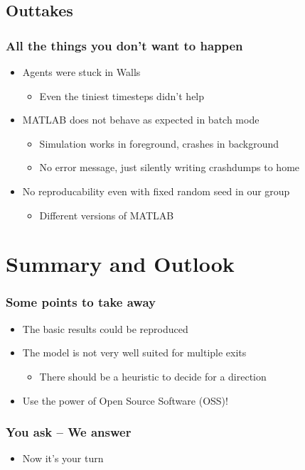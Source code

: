 \documentclass{beamer}
\begin{document}
\subsection{Outtakes}

\begin{frame}
	\frametitle{All the things you don't want to happen}
	\begin{itemize}
		\item Agents were stuck in Walls
		\begin{itemize}
			\item Even the tiniest timesteps didn't help
		\end{itemize}
		\item MATLAB does not behave as expected in batch mode
		\begin{itemize}
			\item Simulation works in foreground, crashes in background
			\item No error message, just silently writing crashdumps to home
		\end{itemize}
		\item No reproducability even with fixed random seed in our group
		\begin{itemize}
			\item Different versions of MATLAB
		\end{itemize}
	\end{itemize}
\end{frame}


\section{Summary and Outlook}
\begin{frame}
	\frametitle{Some points to take away}
	\begin{itemize}
		\item The basic results could be reproduced
		\item The model is not very well suited for multiple exits
		\begin{itemize}
			\item There should be a heuristic to decide for a direction
		\end{itemize}
		\item Use the power of Open Source Software (OSS)!
	\end{itemize}
\end{frame}

\begin{frame}
	\frametitle{You ask -- We answer}
	\begin{itemize}
		\item Now it's your turn
	\end{itemize}
\end{frame}
\end{document}
